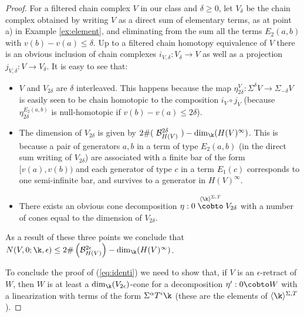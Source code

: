 \begin{proof}
  For a filtered chain complex $V$ in our class and $\delta\geq 0$,
  let $V_{\delta}$ be the chain complex obtained by writing $V$ as a
  direct sum of elementary terms, as at point a) in Example
  \ref{ex:element}, and eliminating from the sum all the terms
  $E_{2}(a,b)$ with $v(b)-v(a)\leq \delta$. Up to a filtered
    chain homotopy equivalence of $V$ there is an obvious inclusion
  of chain complexes $i_{V,\delta}: V_{\delta}\to V$ as well as a
  projection $j_{V,\delta}:V\to V_{\delta}$.  It is easy to see that:
\begin{itemize}
\item[i.] $V$ and $V_{2\delta}$ are $\delta$ interleaved. This happens
  because the map
  $\eta^{V}_{2\delta}:\Sigma^{\delta}V\to \Sigma_{-\delta}V$ is easily
  seen to be chain homotopic to the composition $i_{V}\circ j_{V}$
  (because $\eta^{E_{2}(a,b)}_{2\delta}$ is null-homotopic if
  $v(b)-v(a)\leq 2\delta$).
\item[ii.] The dimension of $V_{2\delta}$ is given by
  $2\# (\ \mathcal{B}^{2\delta}_{H(V)}\ ) - \dim_{\k} (H(V)^{\infty})$.
  This is because a pair of generators $a,b$ in a term of type
  $E_{2}(a,b)$ (in the direct sum writing of $V_{2\delta}$) are
  associated with a finite bar of the form $[v(a),v(b))$ and each
  generator of type $c$ in a term $E_{1}(c)$ corresponds to one
  semi-infinite bar, and survives to a generator in $H(V)^{\infty}$.
\item[iii.] There exists an obvious cone decomposition
  $\eta:0\stackrel{\langle \k\rangle^{\Sigma,T}}{\cobto} V_{2\delta}$
  with a number of cones equal to the dimension of $V_{2\delta}$.
\end{itemize}
As a result of these three points we conclude that
$N(V,0;\k,\epsilon)\leq 2\# \left(
  \mathcal{B}^{2\epsilon}_{H(V)}\right) - \dim_{\k} (H(V)^{\infty})$.

To conclude the proof of (\ref{eq:identi}) we need to show that, if
$V$ is an $\epsilon$-retract of $W$, then $W$ is at least a
$\dim_{\k}(V_{2\epsilon})$-cone for a decomposition
$\eta':0\cobto W$ with a linearization with terms of the form
$\Sigma^{\alpha}T^{i}\k$ (these are the elements of
$\langle\k\rangle^{\Sigma,T}$).


\end{proof}
